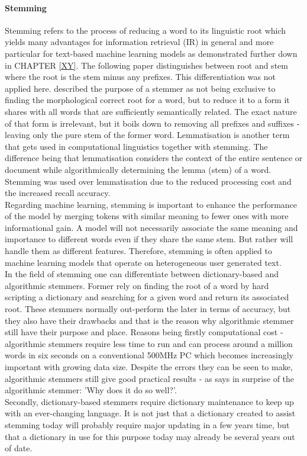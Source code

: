 \paragraph{Stemming} \label{word_stemming}
Stemming refers to the process of reducing a word to its linguistic root which yields many advantages for information retrieval (IR) in general and more particular for text-based machine learning models as demonstrated further down in CHAPTER \ref{XY}. The following paper \parencite{Lovins1968} distinguishes between root and stem where the root is the stem minus any prefixes. This differentiation was not applied here. 
\parencite{Weissweiler2018} described the purpose of a stemmer as not being exclusive to finding the morphological correct root for a word, but to reduce it to a form it shares with all words that are sufficiently semantically related. The exact nature of that form is irrelevant, but it boils down to removing all prefixes and suffixes - leaving only the pure stem of the former word. Lemmatisation is another term that gets used in computational linguistics together with stemming. The difference being that lemmatisation considers the context of the entire sentence or document while algorithmically determining the lemma (stem) of a word. Stemming was used over lemmatisation due to the reduced processing cost and the increased recall accuracy.\\
\newline
Regarding machine learning, stemming is important to enhance the performance of the model by merging tokens with similar meaning to fewer ones with more informational gain. A model will not necessarily associate the same meaning and importance to different words even if they share the same stem. But rather will handle them as different features. Therefore, stemming is often applied to machine learning models that operate on heterogeneous user generated text.\\
\newline
In the field of stemming one can differentiate between dictionary-based and algorithmic stemmers. Former rely on finding the root of a word by hard scripting a dictionary and searching for a given word and return its associated root. These stemmers normally out-perform the later in terms of accuracy, but they also have their drawbacks and that is the reason why algorithmic stemmer still have their purpose and place.  Reasons being firstly computational cost - algorithmic stemmers require less time to run and can process around a million words in six seconds on a conventional 500MHz PC \parencite{Porter2001} which becomes increasingly important with growing data size. Despite the errors they can be seen to make, algorithmic stemmers still give good practical results - as \parencite{Krovetz1995} says in surprise of the algorithmic stemmer: 'Why does it do so well?'.\\ Secondly, dictionary-based stemmers require dictionary maintenance to keep up with an ever-changing language. It is not just that a dictionary created to assist stemming today will probably require major updating in a few years time, but that a dictionary in use for this purpose today may already be several years out of date.\\
